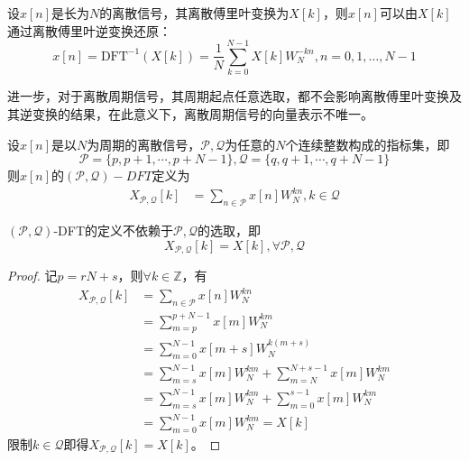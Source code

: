 \begin{theorem}[离散傅里叶反演公式]
    设$x[n]$是长为$N$的离散信号，其离散傅里叶变换为$X[k]$，则$x[n]$可以由$X[k]$通过离散傅里叶逆变换还原：
    \[x[n]=\mathrm{DFT}^{-1}(X[k])=\frac{1}{N}\sum_{k=0}^{N-1}X[k]W_N^{-kn},n=0,1,\dots,N-1\]
\end{theorem}

进一步，对于离散周期信号，其周期起点任意选取，都不会影响离散傅里叶变换及其逆变换的结果，在此意义下，离散周期信号的向量表示不唯一。
\begin{definition}
    设$x[n]$是以$N$为周期的离散信号，$\mathcal{P} ,\mathcal{Q} $为任意的$N$个连续整数构成的指标集，即
    \[\mathcal{P} =\{p,p+1,\cdots,p+N-1\},\mathcal{Q} =\{q,q+1,\cdots,q+N-1\}\]
    则$x[n]$的$(\mathcal{P} ,\mathcal{Q} )-DFT$定义为
    \begin{align*}
    X_{\mathcal{P} ,\mathcal{Q} }[k]&=\sum_{n\in\mathcal{P} }x[n]W_N^{kn},k\in\mathcal{Q}
    \end{align*}
\end{definition}
\begin{proposition}
    $(\mathcal{P} ,\mathcal{Q} )$-DFT的定义不依赖于$\mathcal{P} ,\mathcal{Q} $的选取，即
    \[X_{\mathcal{P} ,\mathcal{Q} }[k]=X[k],\forall \mathcal{P} ,\mathcal{Q} \]
\end{proposition}
\begin{proof}
    记$p=rN+s$，则$\forall k\in\mathbb{Z}$，有\begin{align*}
    X_{\mathcal{P} ,\mathcal{Q} }[k]&=\sum_{n\in\mathcal{P} }x[n]W_N^{kn}\\
    &=\sum_{m=p}^{p+N-1}x[m]W_N^{km}\\
    &=\sum_{m=0}^{N-1}x[m+s]W_N^{k(m+s)}\\
    &=\sum_{m=s}^{N-1}x[m]W_N^{km}+\sum_{m=N}^{N+s-1}x[m]W_N^{km}\\
    &=\sum_{m=s}^{N-1}x[m]W_N^{km}+\sum_{m=0}^{s-1}x[m]W_N^{km}\\
    &=\sum_{m=0}^{N-1}x[m]W_N^{km}=X[k]
    \end{align*}
    限制$k\in\mathcal{Q} $即得$X_{\mathcal{P} ,\mathcal{Q} }[k]=X[k]$。
\end{proof}

